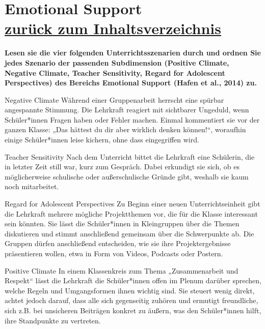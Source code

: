 \documentclass[a4paper]{article}
\newenvironment{question}[2]{%
    \section[#1 \normalfont(#2)]{#1\\\small\normalfont\hyperlink{tableofcontents}{zurück zum Inhaltsverzeichnis}}%
}{%
    \newpage%
}
\newcommand{\questiontext}[1]{\textbf{#1}}
\newenvironment{mapping}[1]{%
    \begin{question}{#1}{Zuordnungsaufgabe}%
    \newcommand{\ismappedto}{\tcblower}%
    \newenvironment{answer}{\begin{mapping-box}}{\end{mapping-box}}%
}{%
    \end{question}%
}
\begin{document}
\begin{mapping}{Emotional Support}
    \questiontext{Lesen sie die vier folgenden Unterrichtsszenarien durch und ordnen Sie jedes Szenario der passenden Subdimension (Positive Climate, Negative Climate, Teacher Sensitivity, Regard for Adolescent Perspectives) des Bereichs Emotional Support (Hafen et al., 2014) zu.}
    \begin{answer}
        Negative Climate
        \ismappedto
        Während einer Gruppenarbeit herrscht eine spürbar angespannte Stimmung. Die Lehrkraft reagiert mit sichtbarer Ungeduld, wenn Schüler*innen Fragen haben oder Fehler machen. Einmal kommentiert sie vor der ganzen Klasse: „Das hättest du dir aber wirklich denken können!“, woraufhin einige Schüler*innen leise kichern, ohne dass eingegriffen wird.
    \end{answer}
    \begin{answer}
        Teacher Sensitivity
        \ismappedto
        Nach dem Unterricht bittet die Lehrkraft eine Schülerin, die in letzter Zeit still war, kurz zum Gespräch. Dabei erkundigt sie sich, ob es möglicherweise schulische oder außerschulische Gründe gibt, weshalb sie kaum noch mitarbeitet.
    \end{answer}
    \begin{answer}
        Regard for Adolescent Perspectives
        \ismappedto
        Zu Beginn einer neuen Unterrichtseinheit gibt die Lehrkraft mehrere mögliche Projektthemen vor, die für die Klasse interessant sein könnten. Sie lässt die Schüler*innen in Kleingruppen über die Themen diskutieren und stimmt anschließend gemeinsam über die Schwerpunkte ab. Die Gruppen dürfen anschließend entscheiden, wie sie ihre Projektergebnisse präsentieren wollen, etwa in Form von Videos, Podcasts oder Postern.
    \end{answer}
    \begin{answer}
        Positive Climate
        \ismappedto
        In einem Klassenkreis zum Thema „Zusammenarbeit und Respekt“ lässt die Lehrkraft die Schüler*innen offen im Plenum darüber sprechen, welche Regeln und Umgangsformen ihnen wichtig sind. Sie steuert wenig direkt, achtet jedoch darauf, dass alle sich gegenseitig zuhören und ermutigt freundliche, sich z.B. bei unsicheren Beiträgen konkret zu äußern, was den Schüler*innen hilft, ihre Standpunkte zu vertreten.
    \end{answer}
\end{mapping}
\end{document}
